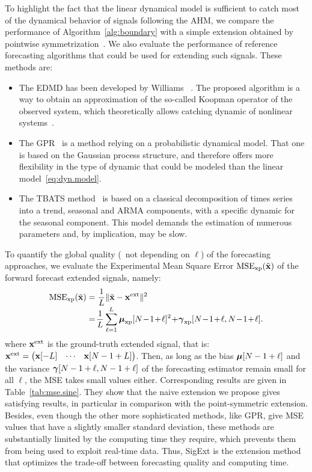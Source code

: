 To highlight the fact that the linear dynamical model is sufficient to catch most of the dynamical behavior of signals following the AHM, we compare the performance of Algorithm~\ref{alg:boundary} with a simple extension obtained by pointwise symmetrization~\cite{Kharitonenko02wavelet}. We also evaluate the performance of reference forecasting algorithms that could be used for extending such signals. These methods are:
\begin{itemize}
\item The EDMD has been developed by Williams \etal~\cite{Williams15data}. The proposed algorithm is a way to obtain an approximation of the so-called Koopman operator of the observed system, which theoretically allows catching dynamic of nonlinear systems~\cite{Korda18linear}.
\item The GPR~\cite{Rasmussen06gaussian} is a method relying on a probabilistic dynamical model. That one is based on the Gaussian process structure, and therefore offers more flexibility in the type of dynamic that could be modeled than the linear model~\eqref{eq:dyn.model}.
\item The TBATS method~\cite{DeLivera11forecasting} is based on a classical decomposition of times series into a trend, seasonal and ARMA components, with a specific dynamic for the seasonal component. This model demands the estimation of numerous parameters and, by implication, may be slow. 
\end{itemize}

To quantify the global quality (\ie~not depending on $\ell$) of the forecasting approaches, we evaluate the Experimental Mean Square Error $\mathrm{MSE_{xp}}(\tilde{{\mathbf x}})$ of the forward forecast extended signals, namely:
\begin{align}
\label{eq:mse}
\mathrm{MSE_{\xp}}(\tilde\bx) &= \dfrac1{L}\|\tilde\bx -\bx^\mathrm{ext}\|^2 \\[-1mm]
\nonumber
&=\! \dfrac1{L}\sum_{\ell=1}^L \bmu_{\xp}[N\!-\!1\!+\!\ell]^2 \!+\! \bgamma_{\xp}[N\!-\!1\!+\!\ell,N\!-\!1\!+\!\ell] .
\end{align}
where ${\mathbf x}^\mathrm{ext}$ is the ground-truth extended signal, that is: ${\mathbf x}^\mathrm{ext} = \begin{pmatrix}{\mathbf x}[-L] & \cdots & {\mathbf x}[N-1+L] \end{pmatrix}$. Then, as long as the bias $\boldsymbol{\mu}[N-1+\ell]$ and the variance $\boldsymbol{\gamma}[N-1+\ell,N-1+\ell]$ of the forecasting estimator remain small for all $\ell$, the MSE takes small values either. Corresponding results are given in Table~\ref{tab:mse.sine}. They show that the naive extension we propose gives satisfying results, in particular in comparison with the point-symmetric extension. Besides, even though the other more sophisticated methods, like GPR, give MSE values that have a slightly smaller standard deviation, these methods are substantially limited by the computing time they require, which prevents them from being used to exploit real-time data. Thus, {\sf SigExt} is the extension method that optimizes the trade-off between forecasting quality and computing time.

